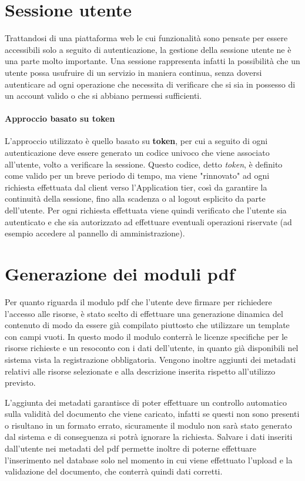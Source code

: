 \section{Sessione utente}
Trattandosi di una piattaforma web le cui funzionalità sono pensate per essere
accessibili solo a seguito di autenticazione, la gestione della sessione utente
ne è una parte molto importante. Una sessione rappresenta infatti la possibilità
che un utente possa usufruire di un servizio in maniera continua, senza doversi
autenticare ad ogni operazione che necessita di verificare che si sia in possesso
di un account valido o che si abbiano permessi sufficienti.

\paragraph{Approccio basato su token}
L'approccio utilizzato è quello basato su \textbf{token}, per cui a seguito
di ogni autenticazione deve essere generato un codice univoco che viene associato
all'utente, volto a verificare la sessione. Questo codice, detto \textit{token}, è
definito come valido per un breve periodo di tempo, ma viene "rinnovato" ad ogni
richiesta effettuata dal client verso l'Application tier, così da garantire la
continuità della sessione, fino alla scadenza o al logout esplicito da parte
dell'utente.
Per ogni richiesta effettuata viene quindi verificato che l'utente sia autenticato
e che sia autorizzato ad effettuare eventuali operazioni riservate (ad esempio
accedere al pannello di amministrazione).


\section{Generazione dei moduli pdf}
Per quanto riguarda il modulo pdf che l'utente deve firmare per richiedere
l'accesso alle risorse, è stato scelto di effettuare una generazione dinamica del
contenuto di modo da essere già compilato piuttosto che utilizzare un template
con campi vuoti.
In questo modo il modulo conterrà le licenze specifiche per le risorse richieste
e un resoconto con i dati dell'utente, in quanto già disponibili nel sistema vista
la registrazione obbligatoria.
Vengono inoltre aggiunti dei metadati relativi alle risorse selezionate e alla
descrizione inserita rispetto all'utilizzo previsto.

L'aggiunta dei metadati garantisce di poter effettuare un controllo automatico
sulla validità del documento che viene caricato, infatti se questi non sono
presenti o risultano in un formato errato, sicuramente il modulo non sarà
stato generato dal sistema e di conseguenza si potrà ignorare la richiesta.
Salvare i dati inseriti dall'utente nei metadati del pdf permette inoltre di
poterne effettuare l'inserimento nel database solo nel momento in cui viene
effettuato l'upload e la validazione del documento, che conterrà quindi dati
corretti.



